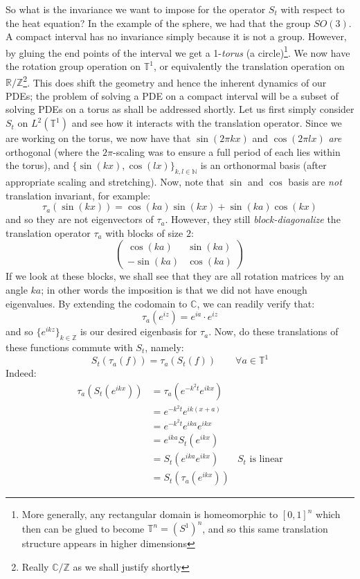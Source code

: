 \documentclass{article}
\newcommand{\C}{{\mathbb{C}}}
\newcommand{\N}{{\mathbb{N}}}
\newcommand{\R}{{\mathbb{R}}}
\newcommand{\T}{{\mathbb{T}}}
\newcommand{\Z}{{\mathbb{Z}}}
\begin{document}
So what is the invariance we want to impose for the operator $S_t$ with respect to the heat equation? In the
example of the sphere, we had that the group $SO(3)$. A compact interval has no invariance simply because it
is not a group. However, by gluing the end points of the interval we get a 1-\emph{torus} (a
circle)\footnote{More generally, any rectangular domain is homeomorphic to $[0,1]^n$ which then can be glued
to become $\T^n = (S^1)^n$, and so this same translation structure appears in higher dimensions}. We now have
the rotation group operation on $\T^1$, or equivalently the translation operation on $\R/\Z$\footnote{Really
$\C/\Z$ as we shall justify shortly}. This does shift the geometry and hence the inherent dynamics of our
PDEs; the problem of solving a PDE on a compact interval will be a subset of solving PDEs on a torus as shall
be addressed shortly. Let us first simply consider $S_t$ on $L^2(\T^1)$ and see how it interacts with the
translation operator. Since we are working on the torus, we now have that $\sin(2\pi kx)$ and $\cos(2\pi lx)$
\emph{are} orthogonal (where the $2\pi$-scaling was to ensure a full period of each lies within the torus),
and $\{\sin(kx), \cos(lx)\}_{k,l \in \N}$ is an orthonormal basis (after appropriate scaling and stretching).
Now, note that $\sin$ and $\cos$ basis are \emph{not} translation invariant, for example:
\[
	\tau_a(\sin(kx)) = \cos(ka)\sin(kx) + \sin(ka)\cos(kx)
\]
and so they are not eigenvectors of $\tau_a$. However, they still \emph{block-diagonalize} the translation
operator $\tau_a$ with blocks of size $2$:
\[
	\begin{pmatrix} \cos(ka) & \sin(ka)\\
	 -\sin(ka) & \cos(ka) \end{pmatrix}
\]
If we look at these blocks, we shall see that they are all rotation matrices by an angle $ka$; in other words the
imposition is that we did not have enough eigenvalues. By extending the codomain to $\C$, we can readily
verify that:
\[
	\tau_a(e^{iz}) = e^{ia}\cdot e^{iz}
\]
and so $\{e^{ikz}\}_{k \in \Z}$ is our desired eigenbasis for $\tau_a$. Now, do these translations of these
functions commute with $S_t$, namely:
\[
	S_t(\tau_a(f)) = \tau_a(S_t(f)) \qquad \forall a \in \T^1
\]
Indeed:
\begin{align*}
	\tau_a(S_t(e^{ikx})) &= \tau_a(e^{-k^2 t} e^{ikx})\\
	&=  e^{-k^2 t} e^{ik(x+a)}\\
	&= e^{-k^2 t} e^{ika} e^{ikx}\\
	&= e^{ika} S_t(e^{ikx})\\
	&= S_t(e^{ika} e^{ikx}) & \text{$S_t$ is linear}\\
	&= S_t(\tau_a(e^{ikx}))
\end{align*}
\end{document}
